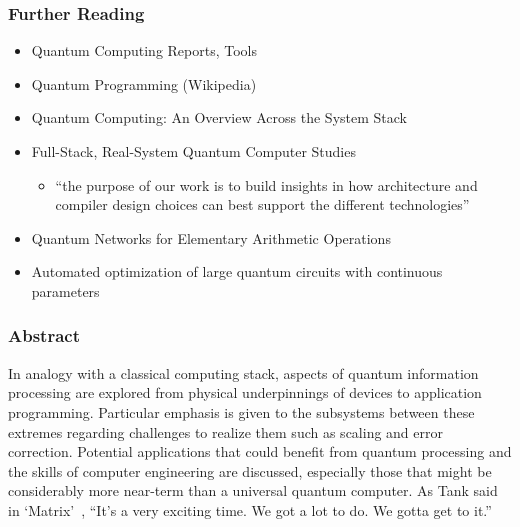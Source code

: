 

\begin{frame}
  \frametitle{Further Reading}
  \begin{itemize}
  \item Quantum Computing Reports, Tools~\cite{qcomprpt-tools}
  \item Quantum Programming (Wikipedia)~\cite{wikipedia-qcomp}
  \item Quantum Computing: An Overview Across the System Stack~\cite{arxiv:1905.07240}
  \item Full-Stack, Real-System Quantum Computer Studies~\cite{arxiv:1905:11349} 
    \begin{itemize}
    \item ``the purpose of our work is to build insights in how architecture and compiler design choices can best support the different technologies''
    \end{itemize}
  \item Quantum Networks for Elementary Arithmetic Operations~\cite{arXiv:9511018}
  \item Automated optimization of large quantum circuits with continuous parameters~\cite{npj-s41534-018-0072-4}
  \end{itemize}
\end{frame}


\begin{frame}
  \frametitle{Abstract}
  In analogy with a classical computing stack, aspects of quantum information processing are explored from physical underpinnings of devices to application programming. Particular emphasis is given to the subsystems between these extremes regarding challenges to realize them such as scaling and error correction. Potential applications that could benefit from quantum processing and the skills of computer engineering are discussed, especially those that might be considerably more near-term than a universal quantum computer. As Tank said in `Matrix'~\cite{movie-Matrix}, ``It’s a very exciting time. We got a lot to do. We gotta get to it.''
\end{frame}


